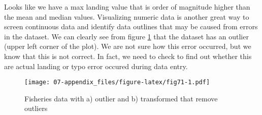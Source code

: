 \documentclass[
  12pt,
  a4paper,
  oneside]{book}
\begin{document}
Looks like we have a max landing value that is order of magnitude higher than the mean and median values. Visualizing numeric data is another great way to screen continuous data and identify data outlines that may be caused from errors in the dataset. We can clearly see from figure \ref{fig:fig71} that the dataset has an outlier (upper left corner of the plot). We are not sure how this error occurred, but we know that this is not correct. In fact, we need to check to find out whether this are actual landing or typo error occured during data entry.

\begin{figure}
\centering
\texttt{[image: 07-appendix\_files/figure-latex/fig71-1.pdf]}
\caption{\label{fig:fig71}Fisheries data with a) outlier and b) transformed that remove outliers}
\end{figure}
\end{document}
